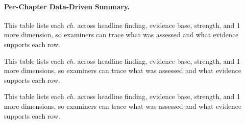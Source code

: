 \paragraph{Per-Chapter Data-Driven Summary.}



\noindent This table lists each \textit{ch.} across headline finding, evidence base, strength, and 1 more dimension, so examiners can trace what was assessed and what evidence supports each row.



\noindent This table lists each \textit{ch.} across headline finding, evidence base, strength, and 1 more dimensions, so examiners can trace what was assessed and what evidence supports each row.


\noindent This table lists each \textit{ch.} across headline finding, evidence base, strength, and 1 more dimensions, so examiners can trace what was assessed and what evidence supports each row.



